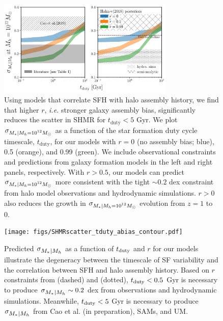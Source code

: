 \documentclass[12pt, letterpaper, preprint, tighten]{aastex62}
\newcommand{\tduty}{t_{\rm duty}}
\newcommand{\siglogm}{\sigma_{\scaleto{M_*|M_h}{8pt}}}
\newcommand{\sigtwe}{\sigma_{\scaleto{M_*|M_h=10^{12}M_\odot}{8pt}}}
\begin{document}
\begin{figure}
\begin{center}
\includegraphics[width=0.75\textwidth]{figs/SHMRscatter_tduty_abias2.pdf}
\caption{
    Using models that correlate SFH with halo assembly history, we find that 
    higher $r$, \emph{i.e.} stronger galaxy assembly bias, significantly reduces the 
    scatter in SHMR for $t_\mathrm{duty} < 5$ Gyr. We plot $\sigtwe$ as a function 
    of the star formation duty cycle timescale, $t_\mathrm{duty}$, for our 
    models with $r = 0$ (no assembly bias; blue), 0.5 (orange), and 0.99 (green).
    We include observational constraints and predictions from galaxy formation models
    in the left and right panels, respectively. With $r > 0.5$, our models can predict 
    $\sigtwe$ more consistent with the tight $\sim0.2$ dex constraint 
    from halo model observations and hydrodynamic simulations. $r > 0$ also reduces the 
    growth in $\sigtwe$ evolution from $z = 1$ to 0.
    }
\label{fig:sigMstar_duty_abias}
\end{center}
\end{figure}

\begin{figure}
\begin{center}
\texttt{[image: figs/SHMRscatter\_tduty\_abias\_contour.pdf]}
    \caption{Predicted $\siglogm$ as a function of $\tduty$ and $r$ for our
    models illustrate the degeneracy between the timescale of SF variability and
    the correlation between SFH and halo assembly history. Based on $r$ constraints
    from \cite{tinker2018b} (dashed) and \cite{behroozi2019} (dotted), $\tduty < 0.5$ Gyr
    is necessary to produce $\siglogm \sim 0.2$ dex from observations and
    hydrodynamic simulations. Meanwhile, $\tduty < 5$ Gyr is necessary to produce
    $\siglogm$ from Cao et al. (in preparation), SAMs, and UM.
    }
\label{fig:r_tduty}
\end{center}
\end{figure}
\end{document}
